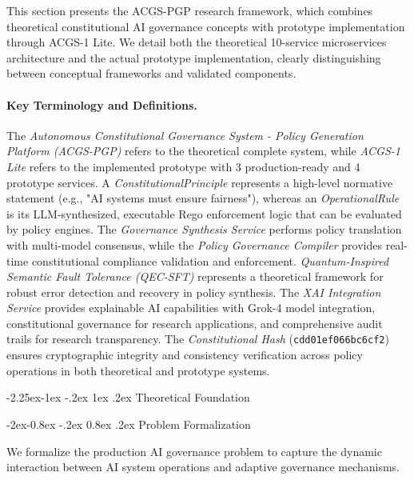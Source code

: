\documentclass[manuscript,screen,9pt]{acmart}
\makeatletter
\renewcommand\subsection{\@startsection{subsection}{2}{\z@}%
  {-2.25ex\@plus -1ex \@minus -.2ex}%
  {1ex \@plus .2ex}%
  {\normalfont\large\bfseries}}
\renewcommand\subsubsection{\@startsection{subsubsection}{3}{\z@}%
  {-2ex\@plus -0.8ex \@minus -.2ex}%
  {0.8ex \@plus .2ex}%
  {\normalfont\normalsize\bfseries}}
\makeatother
\begin{document}
This section presents the ACGS-PGP research framework, which combines theoretical constitutional AI governance concepts with prototype implementation through ACGS-1 Lite. We detail both the theoretical 10-service microservices architecture and the actual prototype implementation, clearly distinguishing between conceptual frameworks and validated components.

\paragraph{Key Terminology and Definitions.} The \textit{Autonomous Constitutional Governance System - Policy Generation Platform (ACGS-PGP)} refers to the theoretical complete system, while \textit{ACGS-1 Lite} refers to the implemented prototype with 3 production-ready and 4 prototype services. A \textit{ConstitutionalPrinciple} represents a high-level normative statement (e.g., "AI systems must ensure fairness"), whereas an \textit{OperationalRule} is its LLM-synthesized, executable Rego enforcement logic that can be evaluated by policy engines. The \textit{Governance Synthesis Service} performs policy translation with multi-model consensus, while the \textit{Policy Governance Compiler} provides real-time constitutional compliance validation and enforcement. \textit{Quantum-Inspired Semantic Fault Tolerance (QEC-SFT)} represents a theoretical framework for robust error detection and recovery in policy synthesis. The \textit{XAI Integration Service} provides explainable AI capabilities with Grok-4 model integration, constitutional governance for research applications, and comprehensive audit trails for research transparency. The \textit{Constitutional Hash} (\texttt{\small{cdd01ef066bc6cf2}}) ensures cryptographic integrity and consistency verification across policy operations in both theoretical and prototype systems.

\subsection{Theoretical Foundation}
\label{subsec:theoretical_foundation}

\subsubsection{Problem Formalization}
\label{subsubsec:problem_formalization}

We formalize the production AI governance problem to capture the dynamic interaction between AI system operations and adaptive governance mechanisms.
\end{document}
